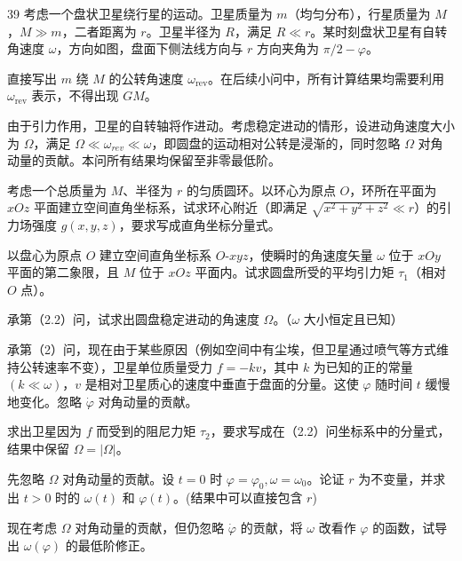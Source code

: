 \begin{problem}[2026年博知汇BWPhO][盘状卫星的转动]{39}
    考虑一个盘状卫星绕行星的运动。卫星质量为 $m$（均匀分布），行星质量为 $M$，$M \gg m$，二者距离为 $r$。卫星半径为 $R$，满足 $R \ll r$。某时刻盘状卫星有自转角速度 $\omega$，方向如图，盘面下侧法线方向与 $r$ 方向夹角为 $\pi/2 - \varphi$。
    \begin{subproblem}
        直接写出 $m$ 绕 $M$ 的公转角速度 $\omega_{\mathrm{rev}}$。在后续小问中，所有计算结果均需要利用 $\omega_{\mathrm{rev}}$ 表示，不得出现 $GM$。
    \end{subproblem}
    \begin{subproblem}
        由于引力作用，卫星的自转轴将作进动。考虑稳定进动的情形，设进动角速度大小为 $\Omega$，满足 $\Omega \ll \omega_{rev} \ll \omega$，即圆盘的运动相对公转是浸渐的，同时忽略 $\Omega$ 对角动量的贡献。本问所有结果均保留至非零最低阶。
        \begin{subsubproblem}
            考虑一个总质量为 $M$、半径为 $r$ 的匀质圆环。以环心为原点 $O$，环所在平面为 $xOz$ 平面建立空间直角坐标系，试求环心附近（即满足 $\sqrt{x^{2}+y^{2}+z^{2}}\ll r$）的引力场强度 $g(x,y,z)$，要求写成直角坐标分量式。
        \end{subsubproblem}
        \begin{subsubproblem}
            以盘心为原点 $O$ 建立空间直角坐标系 $O$-$xyz$，使瞬时的角速度矢量 $\omega$ 位于 $xOy$ 平面的第二象限，且 $M$ 位于 $xOz$ 平面内。试求圆盘所受的平均引力矩 $\tau_{1}$（相对 $O$ 点）。
        \end{subsubproblem}
        \begin{subsubproblem}
            承第（2.2）问，试求出圆盘稳定进动的角速度 $\Omega$。（$\omega$ 大小恒定且已知）
        \end{subsubproblem}
    \end{subproblem}
    \begin{subproblem}
        承第（2）问，现在由于某些原因（例如空间中有尘埃，但卫星通过喷气等方式维持公转速率不变），卫星单位质量受力 $f = -kv$，其中 $k$ 为已知的正的常量 $(k \ll \omega)$，$v$ 是相对卫星质心的速度中垂直于盘面的分量。这使 $\varphi$ 随时间 $t$ 缓慢地变化。忽略 $\dot{\varphi}$ 对角动量的贡献。
        \begin{subsubproblem}
            求出卫星因为 $f$ 而受到的阻尼力矩 $\tau_{2}$，要求写成在（2.2）问坐标系中的分量式，结果中保留 $\Omega = |\Omega|$。
        \end{subsubproblem}
        \begin{subsubproblem}
            先忽略 $\Omega$ 对角动量的贡献。设 $t = 0$ 时 $\varphi = \varphi_0, \omega = \omega_0$。论证 $r$ 为不变量，并求出 $t > 0$ 时的 $\omega(t)$ 和 $\varphi(t)$。(结果中可以直接包含 $r$)
        \end{subsubproblem}
        \begin{subsubproblem}
            现在考虑 $\Omega$ 对角动量的贡献，但仍忽略 $\dot{\varphi}$ 的贡献，将 $\omega$ 改看作 $\varphi$ 的函数，试导出 $\omega (\varphi)$ 的最低阶修正。
        \end{subsubproblem}
    \end{subproblem}
\end{problem}